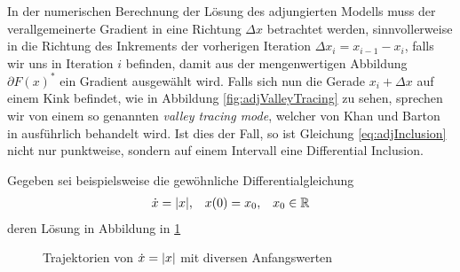 In der numerischen Berechnung der Lösung des adjungierten Modells muss der verallgemeinerte Gradient in eine Richtung $\Delta x$ betrachtet werden, sinnvollerweise in die Richtung des Inkrements der vorherigen Iteration $\Delta x_i = x_{i-1} - x_i$, falls wir uns in Iteration $i$ befinden, damit aus der mengenwertigen Abbildung $ \partial F(x)^*$ ein Gradient ausgewählt wird. 
Falls sich nun die Gerade $x_i + \Delta x$ auf einem Kink befindet, wie in Abbildung \ref{fig:adjValleyTracing} zu sehen, sprechen wir von einem so genannten \textit{valley tracing mode}, welcher von Khan und Barton in \cite{khan2014} ausführlich behandelt wird. Ist dies der Fall, so ist Gleichung \eqref{eq:adjInclusion} nicht nur punktweise, sondern auf einem Intervall eine Differential Inclusion.

Gegeben sei beispielsweise die gewöhnliche Differentialgleichung
\begin{equation}\label{eq:babyEquation}
\begin{aligned}
 \dot{x} = |x|,&& x(0)=x_0,&& x_0\in\mathbb{R}
 \end{aligned}
\end{equation}
deren Lösung in Abbildung in \ref{fig:babyExampleSol}

\begin{figure}[ht]
\footnotesize
\centering

\caption{Trajektorien von $\dot{x}=|x|$ mit diversen Anfangswerten}
\label{fig:babyExampleSol}
% 
% 
\end{figure}

